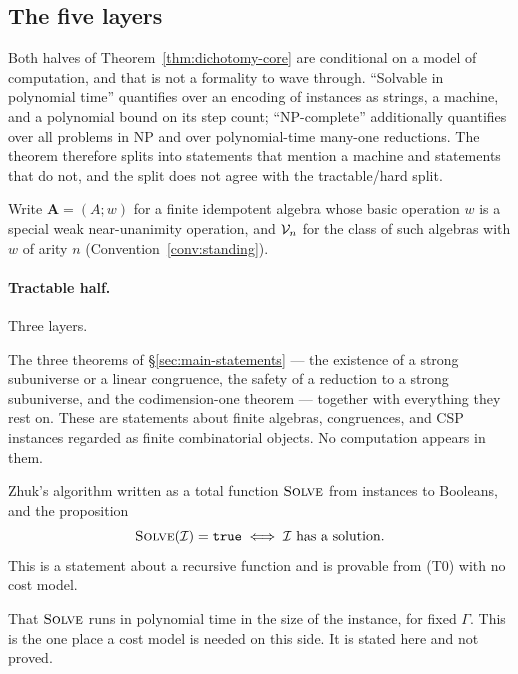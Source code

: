 \subsection{The five layers}

Both halves of Theorem~\ref{thm:dichotomy-core} are conditional on a model of
computation, and that is not a formality to wave through. ``Solvable in
polynomial time'' quantifies over an encoding of instances as strings, a
machine, and a polynomial bound on its step count; ``\textup{NP}-complete''
additionally quantifies over all problems in \textup{NP} and over
polynomial-time many-one reductions. The theorem therefore splits into
statements that mention a machine and statements that do not, and the split
does not agree with the tractable/hard split.

Write $\mathbf A=(A;w)$ for a finite idempotent algebra whose basic operation
$w$ is a special weak near-unanimity operation, and $\mathcal V_{n}$ for the class of such
algebras with $w$ of arity $n$ (Convention~\ref{conv:standing}).

\paragraph{Tractable half.} Three layers.

\begin{description}\tightlist
\item[\textup{(T0)} \emph{The algebraic core.}] The three theorems of
  \S\ref{sec:main-statements} --- the existence of a strong subuniverse or a
  linear congruence, the safety of a reduction to a strong subuniverse, and the
  codimension-one theorem --- together with everything they rest on. These are
  statements about finite algebras, congruences, and CSP instances regarded as
  finite combinatorial objects. No computation appears in them.
\item[\textup{(T1)} \emph{Correctness of the algorithm.}] Zhuk's algorithm
  written as a total function $\textsc{Solve}$ from instances to Booleans, and
  the proposition
  \[
    \textsc{Solve}(\mathcal I)=\texttt{true}\iff
    \mathcal I\ \text{has a solution}.
  \]
  This is a statement about a recursive function and is provable from
  \textup{(T0)} with no cost model.
\item[\textup{(T2)} \emph{The complexity wrapper.}] That $\textsc{Solve}$ runs
  in polynomial time in the size of the instance, for fixed $\Gamma$. This is
  the one place a cost model is needed on this side. It is stated here and not
  proved.
\end{description}

